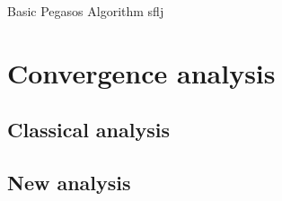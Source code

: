 \begin{frame}{Basic Pegasos Algorithm}
    sflj
\end{frame}
\section{Convergence analysis}
\subsection{Classical analysis}

\subsection{New analysis}


